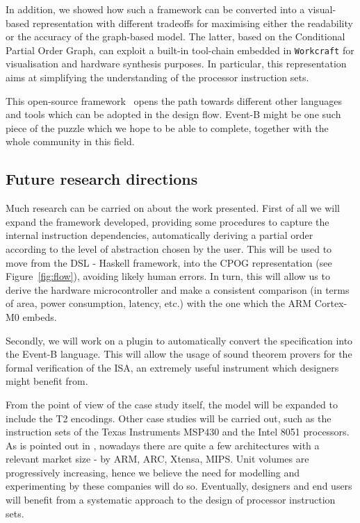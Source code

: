 \documentclass[conference]{IEEEtran}
\begin{document}
In addition, we showed how such a framework can be converted into a visual-based
representation with different tradeoffs for maximising either the readability or the accuracy
of the graph-based model. The latter, based on the Conditional Partial Order Graph, can
exploit a built-in tool-chain embedded in \verb|Workcraft| for visualisation and hardware
synthesis purposes. In particular, this representation aims at simplifying the understanding of
the processor instruction sets.

This open-source framework~\cite{repo} opens the path towards different other languages and tools which
can be adopted in the design flow. Event-B might be one such piece of the puzzle which we
hope to be able to complete, together with the whole community in this field.

\subsection{Future research directions}
\label{sec:frd}
Much research can be carried on about the work presented. First of all we will expand the
framework developed, providing some procedures to capture the internal instruction
dependencies, automatically deriving a partial order according to the level of abstraction
chosen by the user. This will be used to move from the DSL - Haskell framework, into the CPOG
representation (see Figure~\ref{fig:flow}), avoiding likely human errors. In turn, this will
allow us to derive the hardware microcontroller and make a consistent comparison (in terms of
area, power consumption, latency, etc.) with the one which the ARM Cortex-M0 embeds.

Secondly, we will work on a plugin to automatically convert the specification into the
Event-B language. This will allow the usage of sound theorem provers for the formal
verification of the ISA, an extremely useful instrument which designers might benefit from.

From the point of view of the case study itself, the model will be expanded to include the
T2 encodings. Other case studies will be carried out, such as the instruction
sets of the Texas Instruments MSP430 and the Intel 8051 processors. As is pointed out in
\cite{webArticle}, nowadays there are quite a few architectures with a relevant market size -
by ARM, ARC, Xtensa, MIPS. Unit volumes are progressively increasing, hence we believe the
need for modelling and experimenting by these companies will do so. Eventually, designers and
end users will benefit from a systematic approach to the design of processor instruction sets.\\
\end{document}
